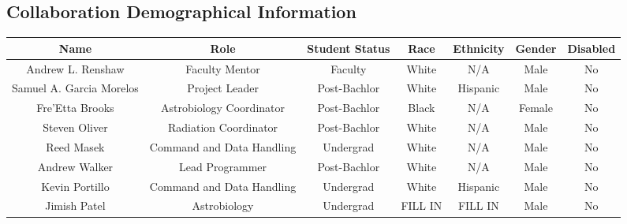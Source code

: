 \begin{appendices}
  \section{Collaboration Demographical Information}
\begin{table}[h!]
\centering  
  \begin{tabular}  { |c|c|c|c|c|c|c|}
  	\hline
      \textbf{Name} &  \textbf{Role} & \textbf{Student Status} & \textbf{Race} & \textbf{Ethnicity} & \textbf{Gender} & \textbf{Disabled}\\
 	\hline
 	Andrew L. Renshaw & Faculty Mentor & Faculty & White & N/A & Male & No\\
 	\hline
 	Samuel A. Garcia Morelos & Project Leader & Post-Bachlor & White & Hispanic & Male & No\\
 	\hline
 	Fre'Etta Brooks & Astrobiology Coordinator & Post-Bachlor & Black & N/A & Female & No\\\hline
 	Steven Oliver & Radiation Coordinator & Post-Bachlor & White & N/A & Male & No\\\hline
 	Reed Masek & Command and Data Handling & Undergrad & White & N/A & Male & No\\\hline
 	Andrew Walker & Lead Programmer & Post-Bachlor & White & N/A & Male & No\\\hline
 	Kevin Portillo & Command and Data Handling & Undergrad & White & Hispanic & Male & No \\\hline
	Jimish Patel & Astrobiology & Undergrad & FILL IN & FILL IN & Male & No \\\hline
	\end{tabular}	
	\end{table}  

\end{appendices}
